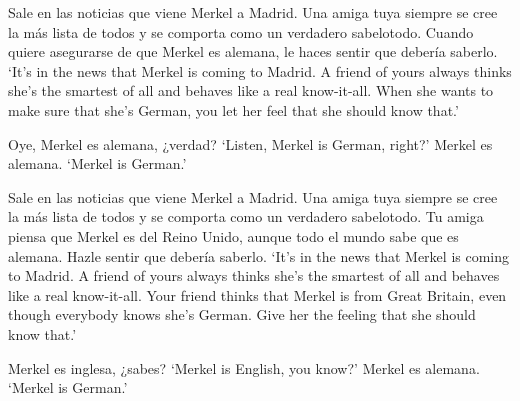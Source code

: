 \begin{exe}
\ex \label{ex:experimentoOBVCONFalemana}
Sale en las noticias que viene Merkel a Madrid. Una amiga tuya siempre se cree la más lista de todos y se comporta como un verdadero sabelotodo. Cuando quiere asegurarse de que Merkel es alemana, le haces sentir que debería saberlo. 
\glt `{It's in the news that Merkel is coming to Madrid. A friend of yours always thinks she's the smartest of all and behaves like a real know-it-all. When she wants to make sure that she's German, you let her feel that she should know that.}'
\begin{xlist}[A:]
 Oye, Merkel es alemana, ¿verdad? \href{https://osf.io/juzy8/}{\faVolumeUp}
\glt `Listen, Merkel is German, right?'
 Merkel es alemana. 
\glt `Merkel is German.' 
\end{xlist}

\ex \label{ex:experimentoOBVDENalemana}
Sale en las noticias que viene Merkel a Madrid. Una amiga tuya siempre se cree la más lista de todos y se comporta como un verdadero sabelotodo. Tu amiga piensa que Merkel es del Reino Unido, aunque todo el mundo sabe que es alemana. Hazle sentir que debería saberlo.
\glt `It's in the news that Merkel is coming to Madrid. A friend of yours always thinks she's the smartest of all and behaves like a real know-it-all. Your friend thinks that Merkel is from Great Britain, even though everybody knows she's German. Give her the feeling that she should know that.' 
\begin{xlist}[A:]
 Merkel es inglesa, ¿sabes? \href{https://osf.io/ctxg3/}{\faVolumeUp}
\glt `{Merkel is English, you know?}'
 Merkel es alemana. 
\glt `{Merkel is German.}'
\end{xlist}
\end{exe}\largerpage

